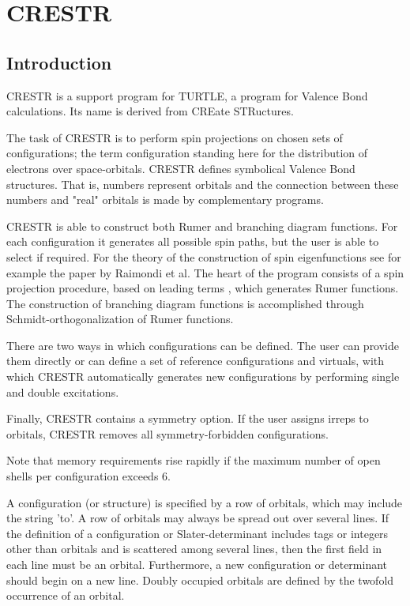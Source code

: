 \documentclass[11pt,fleqn]{article}
\begin{document}
\section[CRESTR]{CRESTR}

\subsection{Introduction}

CRESTR is a support program for TURTLE, a program for Valence Bond 
calculations. Its name is derived from CREate STRuctures. 

The task of CRESTR is to perform spin projections on chosen sets of 
configurations; the term configuration standing here for the 
distribution of electrons over space-orbitals. CRESTR defines 
symbolical Valence Bond structures. That is, numbers represent orbitals 
and the connection between these numbers and "real" orbitals is made 
by complementary programs.

CRESTR is able to construct both Rumer and branching diagram functions. 
For each configuration it generates all possible spin paths, 
but the user is able to select if required. For the theory of the 
construction of spin eigenfunctions see for example the paper by Raimondi
et al. \cite{ref:vb6}
The heart of the program consists of a spin projection procedure, 
based on leading terms \cite{ref:vb6}, which generates 
Rumer functions. The construction of branching diagram functions is 
accomplished through Schmidt-orthogonalization of Rumer functions.

There are two ways in which configurations can be defined. 
The user can provide them directly or can define a set of 
reference configurations and virtuals, with which CRESTR 
automatically generates new configurations by performing 
single and double excitations.

Finally, CRESTR contains a symmetry option. If the user assigns irreps 
to orbitals, CRESTR removes all symmetry-forbidden configurations.

Note that memory requirements rise rapidly if the maximum  number of
open shells per configuration exceeds 6.

A configuration (or structure) is specified by a row of orbitals,
which may include the string 'to'.  A row of orbitals may always be
spread out over several lines.  If the definition of a configuration or
Slater-determinant includes tags or integers other than orbitals and
is scattered among several lines, then the first field in each line
must be an orbital.  Furthermore, a new configuration or determinant
should begin on a new line. Doubly occupied orbitals are defined by
the twofold occurrence of an orbital.
\end{document}

